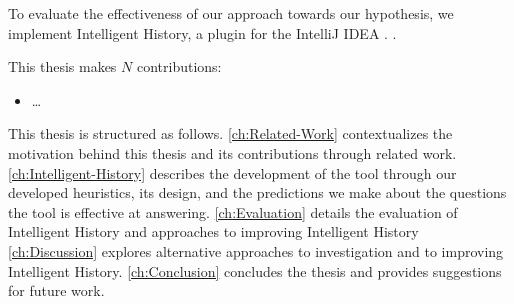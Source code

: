 To evaluate the effectiveness of our approach towards our hypothesis, we implement Intelligent History, a plugin for the IntelliJ IDEA . .

This thesis makes $N$ contributions:
\begin{itemize}
	\item \dots {}
\end{itemize}

This thesis is structured as follows. 
\autoref{ch:Related-Work} contextualizes the motivation behind this thesis and its contributions through related work. 
\autoref{ch:Intelligent-History} describes the development of the tool through our developed heuristics, its design, and the predictions we make about the questions the tool is effective at answering. 
\autoref{ch:Evaluation} details the evaluation of Intelligent History and approaches to improving Intelligent History
\autoref{ch:Discussion} explores alternative approaches to investigation and to improving Intelligent History.
\autoref{ch:Conclusion} concludes the thesis and provides suggestions for future work.

\endinput

Any text after an \endinput is ignored.
You could put scraps here or things in progress.
